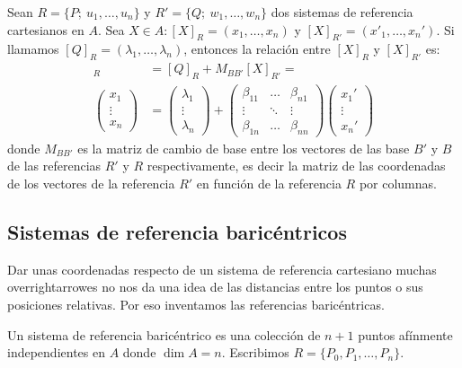 \documentclass[14pt]{book}
\begin{document}
\begin{tm}
	Sean $R = \{P;\ u_1, \dots, u_n\}$ y $R' = \{Q;\ w_1, \dots, w_n\}$ dos sistemas de referencia cartesianos en $A$. Sea $X \in A: [X]_R = (x_1, \dots, x_n)$ y $[X]_{R'} = (x'_1, \dots, x_n')$. Si llamamos $[Q]_R = (\lambda_1, \dots, \lambda_n)$, entonces la relación entre $[X]_R$ y $[X]_{R'}$ es:
	\begin{align*}
		[X]_R &= [Q]_R + M_{BB'}[X]_{R'} = \\
		\left(\begin{array}{c} x_1 \\ \vdots \\ x_n \end{array}\right) &= 
		\left(\begin{array}{c} \lambda_1 \\ \vdots \\ \lambda_n \end{array}\right) + 
		\left(\begin{array}{ccc}
			\beta_{11} & \dots & \beta_{n1} \\
			\vdots & \ddots & \vdots \\
			\beta_{1n} & \dots & \beta_{nn}
		\end{array}\right)
		\left(\begin{array}{c} x_1' \\ \vdots \\ x_n' \end{array}\right)
	\end{align*}
	donde $M_{BB'}$ es la matriz de cambio de base entre los vectores de las base $B'$ y $B$ de las referencias $R'$ y $R$ respectivamente, es decir la matriz de las coordenadas de los vectores de la referencia $R'$ en función de la referencia $R$ por columnas.
\end{tm}

\subsection{Sistemas de referencia baricéntricos}

Dar unas coordenadas respecto de un sistema de referencia cartesiano muchas overrightarrowes no nos da una idea de las distancias entre los puntos o sus posiciones relativas. Por eso inventamos las referencias baricéntricas.

\begin{dfn}
	Un sistema de referencia baricéntrico es una colección de $n+1$ puntos afínmente independientes en $A$ donde $\dim A = n$. Escribimos $R = \{P_0, P_1, \dots, P_n\}$.
\end{dfn}
\end{document}
